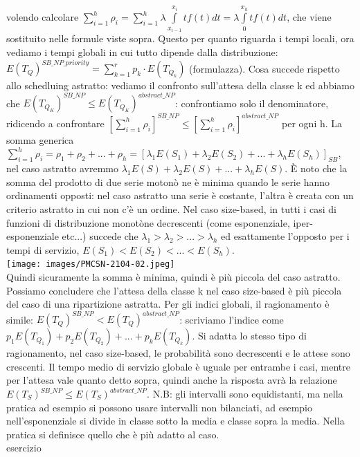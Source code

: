\documentclass{article}
\begin{document}
volendo calcolare $\sum\limits_{i=1}^{h} \rho_i = \sum\limits_{i=1}^{h} \lambda \int\limits_{x_{i-1}}^{x_i} tf(t) dt = \lambda \int\limits_{0}^{x_h} t f(t) dt$, che viene sostituito nelle formule viste sopra. Questo per quanto riguarda i tempi locali, ora vediamo i tempi globali in cui tutto dipende dalla distribuzione: $E(T_Q)^{SB\_NP\_priority} = \sum\limits_{k=1}^{r}p_k \cdot E(T_{Q_k})$ (formulazza). Cosa succede rispetto allo schedluing astratto: vediamo il confronto sull'attesa della classe k ed abbiamo che $E(T_{Q_K})^{SB\_NP} \leq E(T_{Q_K})^{abstract\_NP}$: confrontiamo solo il denominatore, ridicendo a confrontare $[\sum\limits_{i=1}^{h} \rho_i]^{SB\_NP} \leq [\sum\limits_{i=1}^{h} \rho_i]^{abstract\_NP}$ per ogni h. La somma generica $\sum\limits_{i=1}^{h} \rho_i = \rho_1 + \rho_2 + ... + \rho_h = [\lambda_1E(S_1) + \lambda_2E(S_2) + ... +\lambda_hE(S_h)]_{SB}$, nel caso astratto avremmo $\lambda_1E(S)+\lambda_2E(S) +...+\lambda_hE(S)$. È noto che la somma del prodotto di due serie motonò ne è minima quando le serie hanno ordinamenti opposti: nel caso astratto una serie è costante, l'altra è creata con un criterio astratto in cui non c'è un ordine. Nel caso size-based, in tutti i casi di funzioni di distribuzione monotòne decrescenti (come esponenziale, iper-esponenziale etc...) succede che $\lambda_1 > \lambda_2 > ... >\lambda_h$ ed esattamente l'opposto per i tempi di servizio, $E(S_1) < E(S_2) < ... < E(S_h)$.\\ 
\texttt{[image: images/PMCSN-2104-02.jpeg]}\\
Quindi sicuramente la somma è minima, quindi è più piccola del caso astratto. Possiamo concludere che l'attesa della classe k nel caso size-based è più piccola del caso di una ripartizione astratta. Per gli indici globali, il ragionamento è simile: $E(T_Q)^{SB\_NP} < E(T_Q)^{abstract\_NP}$: scriviamo l'indice come $p_1E(T_{Q_1}) + p_2E(T_{Q_2}) + ... +p_kE(T_{Q_k})$. Si adatta lo stesso tipo di ragionamento, nel caso size-based, le probabilità sono decrescenti e le attese sono crescenti. Il tempo medio di servizio globale è uguale per entrambe i casi, mentre per l'attesa vale quanto detto sopra, quindi anche la risposta avrà la relazione $E(T_S)^{SB\_NP} \leq E(T_S)^{abstract\_NP}$.
N.B: gli intervalli sono equidistanti, ma nella pratica ad esempio si possono usare intervalli non bilanciati, ad esempio nell'esponenziale si divide in classe sotto la media e classe sopra la media. Nella pratica si definisce quello che è più adatto al caso.\\ esercizio\\ 
\end{document}
